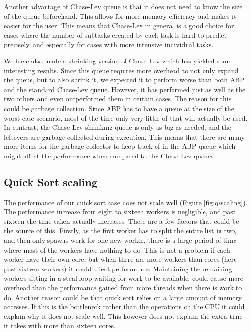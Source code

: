 Another advantage of Chase-Lev queue is that it does not need to know the size of the queue beforehand. This allows for more memory efficiency and makes it easier for the user. This means that Chase-Lev in general is a good choice for cases where the number of subtasks created by each task is hard to predict precisely, and especially for cases with more intensive individual tasks.

We have also made a shrinking version of Chase-Lev which has yielded some interesting results. Since this queue requires more overhead to not only expand the queue, but to also shrink it, we expected it to perform worse than both ABP and the standard Chase-Lev queue. However, it has performed just as well as the two others and even outperformed them in certain cases. The reason for this could be garbage collection. Since ABP has to have a queue at the size of the worst case scenario, most of the time only very little of that will actually be used. In contrast, the Chase-Lev shrinking queue is only as big as needed, and the leftovers are garbage collected during execution. This means that there are many more items for the garbage collector to keep track of in the ABP queue which might affect the performance when compared to the Chase-Lev queues.

\subsection{Quick Sort scaling}
The performance of our quick sort case does not scale well (Figure \ref{fig:qsscaling}). The performance increase from eight to sixteen workers is negligible, and past sixteen the time taken actually increases. There are a few factors that could be the source of this. Firstly, as the first worker has to split the entire list in two, and then only spawns work for one new worker, there is a large period of time where most of the workers have nothing to do. This is not a problem if each worker have their own core, but when there are more workers than cores (here past sixteen workers) it could affect performance. Maintaining the remaining workers sitting in a steal loop waiting for work to be available, could cause more overhead than the performance gained from more threads when there is work to do. Another reason could be that quick sort relies on a large amount of memory accesses. If this is the bottleneck rather than the operations on the CPU it could explain why it does not scale well. This however does not explain the extra time it takes with more than sixteen cores.

